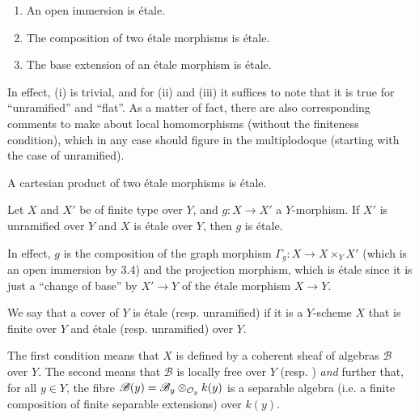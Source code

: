 \begin{prop}
    \begin{enumerate}[\normalfont(i)]
        \item An open immersion is étale.
        \item The composition of two étale morphisms is étale.
        \item The base extension of an étale morphism is étale.
    \end{enumerate}
\end{prop}

In effect, (i) is trivial, and for (ii) and (iii) it suffices to note that it is true for ``unramified'' and ``flat''.
As a matter of fact, there are also corresponding comments to make about local homomorphisms (without the finiteness condition), which in any case should figure in the multiplodoque (starting with the case of unramified).

\begin{cor}
    A cartesian product of two étale morphisms is étale.
\end{cor}

\begin{cor}
    Let $X$ and $X'$ be of finite type over $Y$, and $g\colon X\to X'$ a $Y$-morphism.
    If $X'$ is unramified over $Y$ and $X$ is étale over $Y$, then $g$ is étale.
\end{cor}

In effect, $g$ is the composition of the graph morphism $\Gamma_g\colon X\to X\times_Y X'$ (which is an open immersion by 3.4) and the projection morphism, which is étale since it is just a ``change of base'' by $X'\to Y$ of the étale morphism $X\to Y$.

\begin{defn}
    We say that a cover of $Y$ is étale (resp. unramified) if it is a $Y$-scheme $X$ that is finite over $Y$ and étale (resp. unramified) over $Y$.
\end{defn}
The first condition means that $X$ is defined by a coherent sheaf of algebras $\mathscr{B}$ over $Y$.
The second means that $\mathscr{B}$ is locally free over $Y$ (resp. ) \emph{and} further that, for all $y\in Y$, the fibre $\mathscr{B}(y)=\mathscr{B}_y\otimes_{\mathcal{O}_y}k(y)$ is a separable algebra (i.e. a finite composition of finite separable extensions) over $k(y)$.


